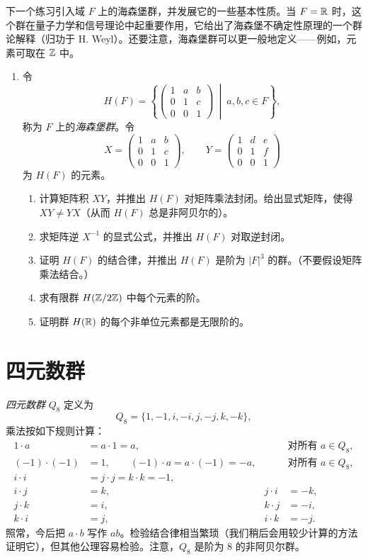 下一个练习引入域 $F$ 上的海森堡群，并发展它的一些基本性质。当 $F=\mathbb{R}$ 时，这个群在量子力学和信号理论中起重要作用，它给出了海森堡不确定性原理的一个群论解释（归功于 H. Weyl）。还要注意，海森堡群可以更一般地定义——例如，元素可取在 $\mathbb{Z}$ 中。
\begin{enumerate}[label=\arabic*.,resume]
  \item 令
  \[
    H(F)=\left\{\begin{pmatrix}1&a&b\\0&1&c\\0&0&1\end{pmatrix}\ \middle|\ a,b,c\in F\right\},
  \]
  称为 $F$ 上的\emph{海森堡群}。令
  \[
    X=\begin{pmatrix}1&a&b\\0&1&c\\0&0&1\end{pmatrix},\qquad
    Y=\begin{pmatrix}1&d&e\\0&1&f\\0&0&1\end{pmatrix}
  \]
  为 $H(F)$ 的元素。
  \begin{enumerate}[label=(\alph*)]
    \item 计算矩阵积 $XY$，并推出 $H(F)$ 对矩阵乘法封闭。给出显式矩阵，使得 $XY\neq YX$（从而 $H(F)$ 总是非阿贝尔的）。
    \item 求矩阵逆 $X^{-1}$ 的显式公式，并推出 $H(F)$ 对取逆封闭。
    \item 证明 $H(F)$ 的结合律，并推出 $H(F)$ 是阶为 $|F|^3$ 的群。（不要假设矩阵乘法结合。）
    \item 求有限群 $H(\mathbb{Z}/2\mathbb{Z})$ 中每个元素的阶。
    \item 证明群 $H(\mathbb{R})$ 的每个非单位元素都是无限阶的。
  \end{enumerate}
\end{enumerate}

\section{四元数群}

\emph{四元数群} $Q_8$ 定义为
\[
  Q_8=\{1,-1,i,-i,j,-j,k,-k\},
\]
乘法按如下规则计算：
\begin{align*}
  1\cdot a&=a\cdot1=a, &&\text{对所有 }a\in Q_8,\\
  (-1)\cdot(-1)&=1,\qquad (-1)\cdot a=a\cdot(-1)=-a, &&\text{对所有 }a\in Q_8,\\
  i\cdot i&=j\cdot j=k\cdot k=-1,\\
  i\cdot j&=k, & j\cdot i&=-k,\\
  j\cdot k&=i, & k\cdot j&=-i,\\
  k\cdot i&=j, & i\cdot k&=-j.
\end{align*}
照常，今后把 $a\cdot b$ 写作 $ab$。检验结合律相当繁琐（我们稍后会用较少计算的方法证明它），但其他公理容易检验。注意，$Q_8$ 是阶为 $8$ 的非阿贝尔群。

